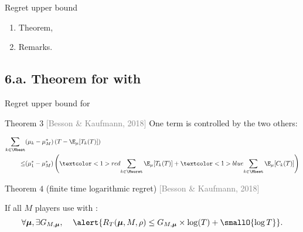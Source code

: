 \begin{frame}{Regret upper bound}

\begin{enumerate}
\def\labelenumi{\arabic{enumi}.}
\tightlist
\item
  Theorem,\vspace*{15pt}
\item
  Remarks.\vspace*{15pt}
\end{enumerate}

\end{frame}



\subsection{\hfill{}6.a. Theorem for \MCTopM{} with \klUCB\hfill{}}

\begin{frame}{Regret upper bound for \MCTopM{}}

\begin{block}{Theorem $3$
\hfill{}\textcolor{gray}{[Besson \& Kaufmann, 2018]}}
One term is controlled by the two others:
\begin{small}\begin{align*}
\sum_{k \in \Mbest} & (\mu_k -  \mu_M^*) \left(T - \E_{\mu}[T_k(T)]\right) \\
\leq
&(\mu_1^* -  \mu_M^*) \left( \textcolor<1>{red}{\sum_{k \in \Mworst} \E_{\mu}[T_k(T)]} + \textcolor<1>{blue}{\sum_{k \in \Mbest} \E_{\mu}[C_k(T)]} \right)
\end{align*}\end{small}

\end{block}

\pause

\begin{block}{Theorem $4$ (finite time logarithmic regret)
\hfill{}\textcolor{gray}{[Besson \& Kaufmann, 2018]}}

If all \(M\) players use \MCTopM{} with \klUCB:
\[
\forall \boldsymbol{\mu}, \exists G_{M,\boldsymbol{\mu}},\;\;\;\;
\alert{R_T(\boldsymbol{\mu}, M, \rho) \leq G_{M,\boldsymbol{\mu}} \times \log(T) + \smallO{\log T}}.
\]

\end{block}

\end{frame}


